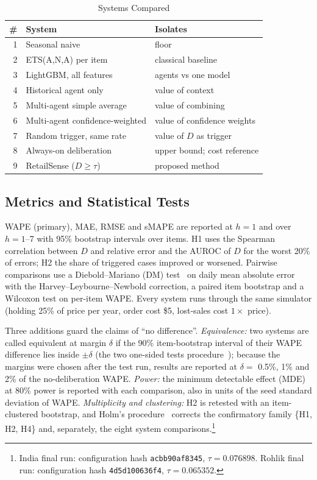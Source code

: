\documentclass[conference]{IEEEtran}
\begin{document}
\begin{table}[t]
\caption{Systems Compared}
\label{tab:systems}
\centering
\footnotesize
\begin{tabularx}{\columnwidth}{@{}rlX@{}}
\toprule
\# & System & Isolates \\
\midrule
1 & Seasonal naive & floor \\
2 & ETS(A,N,A) per item & classical baseline \\
3 & LightGBM, all features & agents vs one model \\
4 & Historical agent only & value of context \\
5 & Multi-agent simple average & value of combining \\
6 & Multi-agent confidence-weighted & value of confidence weights \\
7 & Random trigger, same rate & value of $D$ as trigger \\
8 & Always-on deliberation & upper bound; cost reference \\
9 & RetailSense ($D\ge\tau$) & proposed method \\
\bottomrule
\end{tabularx}
\end{table}

\subsection{Metrics and Statistical Tests}
WAPE (primary), MAE, RMSE and sMAPE are reported at $h=1$ and over $h=1$--7 with 95\% bootstrap
intervals over items. H1 uses the Spearman correlation between $D$ and relative error and the AUROC
of $D$ for the worst 20\% of errors; H2 the share of triggered cases improved or worsened. Pairwise
comparisons use a Diebold--Mariano (DM) test~\cite{diebold1995} on daily mean absolute error with the
Harvey--Leybourne--Newbold correction, a paired item bootstrap and a Wilcoxon test on per-item WAPE.
Every system runs through the same simulator (holding 25\% of price per year, order cost \$5,
lost-sales cost $1\times$ price).

Three additions guard the claims of ``no difference''. \emph{Equivalence:} two systems are called
equivalent at margin $\delta$ if the 90\% item-bootstrap interval of their WAPE difference lies inside
$\pm\delta$ (the two one-sided tests procedure~\cite{schuirmann1987}); because the margins were chosen
after the test run, results are reported at $\delta=$ 0.5\%, 1\% and 2\% of the no-deliberation WAPE.
\emph{Power:} the minimum detectable effect (MDE) at 80\% power is reported with each comparison,
also in units of the seed standard deviation of WAPE. \emph{Multiplicity and clustering:} H2 is
retested with an item-clustered bootstrap, and Holm's procedure~\cite{holm1979} corrects the
confirmatory family \{H1, H2, H4\} and, separately, the eight system comparisons.\footnote{India
final run: configuration hash \texttt{acbb90af8345}, $\tau=0.076898$. Rohlik final run:
configuration hash \texttt{4d5d100636f4}, $\tau=0.065352$.}
\end{document}
